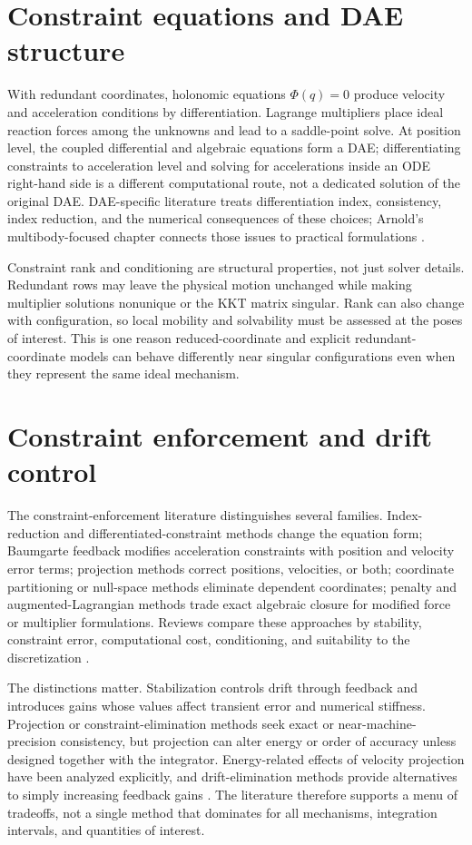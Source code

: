 \section*{Constraint equations and DAE structure}
With redundant coordinates, holonomic equations $\Phi(q)=0$ produce velocity and acceleration conditions by differentiation. Lagrange multipliers place ideal reaction forces among the unknowns and lead to a saddle-point solve. At position level, the coupled differential and algebraic equations form a DAE; differentiating constraints to acceleration level and solving for accelerations inside an ODE right-hand side is a different computational route, not a dedicated solution of the original DAE. DAE-specific literature treats differentiation index, consistency, index reduction, and the numerical consequences of these choices; Arnold's multibody-focused chapter connects those issues to practical formulations \cite{ascherpetzold1998,hairerwanner1996,arnold2017dae}.

Constraint rank and conditioning are structural properties, not just solver details. Redundant rows may leave the physical motion unchanged while making multiplier solutions nonunique or the KKT matrix singular. Rank can also change with configuration, so local mobility and solvability must be assessed at the poses of interest. This is one reason reduced-coordinate and explicit redundant-coordinate models can behave differently near singular configurations even when they represent the same ideal mechanism.

\section*{Constraint enforcement and drift control}
The constraint-enforcement literature distinguishes several families. Index-reduction and differentiated-constraint methods change the equation form; Baumgarte feedback modifies acceleration constraints with position and velocity error terms; projection methods correct positions, velocities, or both; coordinate partitioning or null-space methods eliminate dependent coordinates; penalty and augmented-Lagrangian methods trade exact algebraic closure for modified force or multiplier formulations. Reviews compare these approaches by stability, constraint error, computational cost, conditioning, and suitability to the discretization \cite{baumgarte1972stabilization,laulusa2008classical,bauchau2008contemporary}.

The distinctions matter. Stabilization controls drift through feedback and introduces gains whose values affect transient error and numerical stiffness. Projection or constraint-elimination methods seek exact or near-machine-precision consistency, but projection can alter energy or order of accuracy unless designed together with the integrator. Energy-related effects of velocity projection have been analyzed explicitly, and drift-elimination methods provide alternatives to simply increasing feedback gains \cite{garciaorden2010energyprojection,braun2009drift}. The literature therefore supports a menu of tradeoffs, not a single method that dominates for all mechanisms, integration intervals, and quantities of interest.

